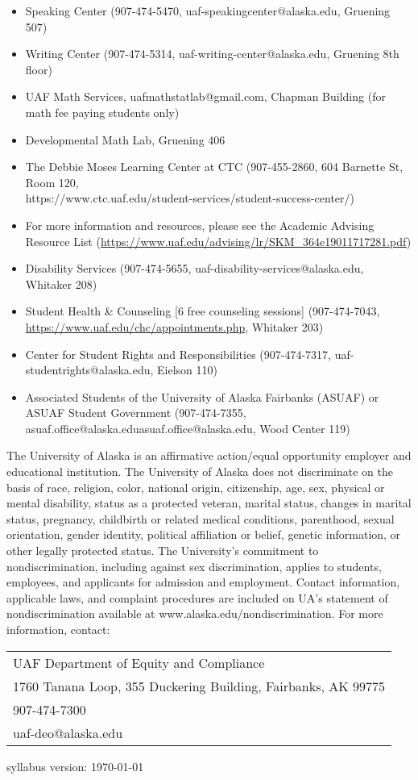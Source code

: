\documentclass[11pt]{article}
\begin{document}
\begin{itemize}
\setlength\itemsep{0em}
        \item Speaking Center (907-474-5470,
        {uaf-speakingcenter@alaska.edu}, Gruening 507)
\item Writing Center (907-474-5314, {uaf-writing-center@alaska.edu}, Gruening 8th floor)
\item UAF Math Services, {uafmathstatlab@gmail.com}, Chapman Building (for math fee paying students only)
\item Developmental Math Lab, Gruening 406
\item The Debbie Moses Learning Center at CTC (907-455-2860, 604 Barnette St, Room 120,\\ {https://www.ctc.uaf.edu/student-services/student-success-center/})
\item For more information and resources, please see the Academic Advising Resource List (\url{https://www.uaf.edu/advising/lr/SKM_364e19011717281.pdf})
\end{itemize}

\begin{itemize}
\setlength\itemsep{0em}
\item Disability Services (907-474-5655, {uaf-disability-services@alaska.edu}, Whitaker 208)
\item Student Health \& Counseling [6 free counseling sessions] (907-474-7043, \url{https://www.uaf.edu/chc/appointments.php}, Whitaker 203)
\item Center for Student Rights and Responsibilities (907-474-7317, {uaf-studentrights@alaska.edu}, Eielson 110)
\item Associated Students of the University of Alaska Fairbanks (ASUAF) or ASUAF Student Government (907-474-7355, {asuaf.office@alaska.edu}{asuaf.office@alaska.edu}, Wood Center 119)
\end{itemize}

The University of Alaska is an affirmative action/equal opportunity employer and educational institution. The University of Alaska does not discriminate on the basis of race, religion, color, national origin, citizenship, age, sex, physical or mental disability, status as a protected veteran, marital status, changes in marital status, pregnancy, childbirth or related medical conditions, parenthood, sexual orientation, gender identity, political affiliation or belief, genetic information, or other legally protected status. The University's commitment to nondiscrimination, including against sex discrimination, applies to students, employees, and applicants for admission and employment. Contact information, applicable laws, and complaint procedures are included on UA's statement of nondiscrimination available at www.alaska.edu/nondiscrimination. For more information, contact:

\begin{tabular}{l}
UAF Department of Equity and Compliance\\
1760 Tanana Loop, 355 Duckering Building, Fairbanks, AK  99775\\
907-474-7300\\
{uaf-deo@alaska.edu}
\end{tabular}

\hfill

 \scriptsize syllabus version: \today \normalsize
\end{document}
